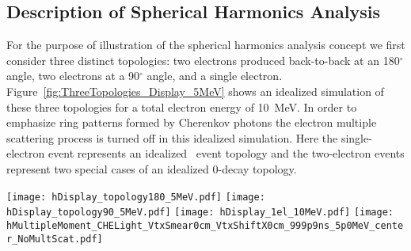 \subsection{Description of Spherical Harmonics Analysis}

For the purpose of illustration of the spherical harmonics analysis concept we first consider three distinct topologies: 
two electrons produced back-to-back at an 180$^{\circ}$ angle, two electrons at a 90$^{\circ}$ angle, and a single electron.
Figure~\ref{fig:ThreeTopologies_Display_5MeV} shows an idealized simulation of these three topologies for a total electron 
energy of 10~MeV. In order to emphasize ring patterns formed by Cherenkov photons the electron multiple scattering process is turned off
in this idealized simulation. Here the single-electron event represents an idealized \B~event topology and the two-electron events represent
two special cases of an idealized 0\nbb-decay topology.


\begin{figure*}[h]
  \centering
  \texttt{[image: hDisplay\_topology180\_5MeV.pdf]}
  \texttt{[image: hDisplay\_topology90\_5MeV.pdf]}
  \texttt{[image: hDisplay\_1el\_10MeV.pdf]}
  \texttt{[image: hMultipleMoment\_CHELight\_VtxSmear0cm\_VtxShiftX0cm\_999p9ns\_5p0MeV\_center\_NoMultScat.pdf]}
  \caption{\emph{Top panels:} Idealized event displays for the three representative event topologies: two 5~MeV 
    back-to-back electrons (\emph{top left}), two 5~MeV electrons at 90$^{\circ}$ angle (\emph{top middle}), and a single 10~MeV electron
    (\emph{top right}). Multiple scattering is turned off in the simulation to emphasize the difference in the mutual orientation of
    Cherenkov rings for the three topologies. For the illustration purposes 100\% QE is applied to Cherenkov photons (triangles)
    and the default QE is applied to scintillation photons (dots). All electrons originate at the center of the
    detector. One typical event is shown for each topology.
    \emph{Bottom panel:} Normalized power spectrum $S_l$ calculated for distribution of Cherenkov photons only. The three
    topologies are compared: two 5~MeV back-to-back electrons (\emph{solid red line}), two 5~MeV electrons at 90$^{\circ}$ angle
    (\emph{dotted magenta line}), and a single 10~MeV electron (\emph{dashed blue line}). For each topology 100 events were simulated. 
    The normalized power values $S_l$'s were calculated for each individual event. The horizontal lines correspond to the mean values of 
    $S_l$ within each event topology. The vertical bars show one standard deviation from the mean value.}
  \label{fig:ThreeTopologies_Display_5MeV}
\end{figure*}



